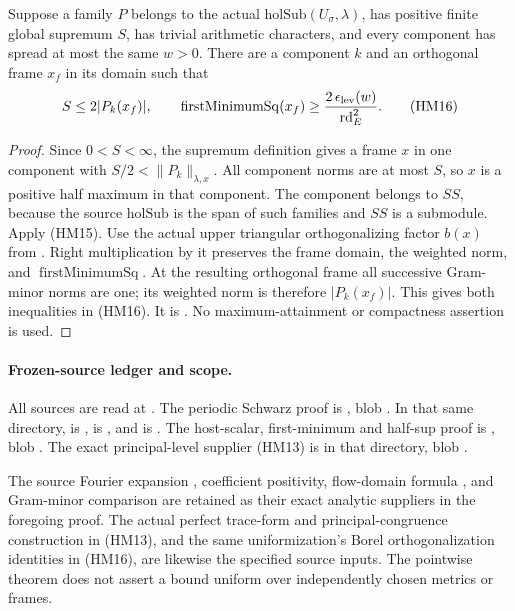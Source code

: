 \begin{srproposition}\label{prop:sr-source-orthogonal-halfmax}
Suppose a family \(P\) belongs to the actual
\(\mathrm{holSub}(U_\sigma,\lambda)\), has positive finite
global supremum \(S\), has trivial arithmetic characters, and
every component has spread at most the same \(w>0\).
There are a component \(k\) and an orthogonal frame \(x_f\) in
its domain such that
\[
              S\le2|P_k(x_f)|,\qquad
 \operatorname{firstMinimumSq}(x_f)
             \ge {2\,\epsilon_{\rm lev}(w)\over\mathrm{rd}_E^2}.
 \tag{HM16}\label{eq:sr-source-orthogonal-halfmax}
\]
\end{srproposition}
\begin{proof}
Since \(0<S<\infty\), the supremum definition gives a frame
\(x\) in one component with \(S/2<\|P_k\|_{\lambda,x}\).
All component norms are at most \(S\), so \(x\) is a positive
half maximum in that component.
The component belongs to \(SS\), because the source
\(\mathrm{holSub}\) is the span of such families and \(SS\)
is a submodule.
Apply (HM15).
Use the actual upper triangular orthogonalizing factor \(b(x)\)
from .
Right multiplication by it preserves the frame domain, the
weighted norm, and \(\operatorname{firstMinimumSq}\).
At the resulting orthogonal frame all successive Gram-minor
norms are one; its weighted norm is therefore \(|P_k(x_f)|\).
This gives both inequalities in (HM16).
It is .
No maximum-attainment or compactness assertion is used.
\end{proof}

\paragraph{Frozen-source ledger and scope.}
All sources are read at .
The periodic Schwarz proof is
,
blob .
In that same directory,
 is
,
 is
, and
 is
.
The host-scalar, first-minimum and half-sup proof is
,
blob .
The exact principal-level supplier (HM13) is
 in
that directory, blob .

The source Fourier expansion , coefficient
positivity, flow-domain formula ,
and Gram-minor comparison  are retained as
their exact analytic suppliers in the foregoing proof.
The actual perfect trace-form and principal-congruence
construction in (HM13), and the same uniformization's Borel
orthogonalization identities in (HM16), are likewise the
specified source inputs. The pointwise theorem does not assert
a bound uniform over independently chosen metrics or frames.
